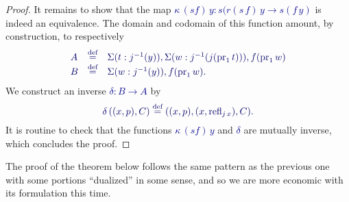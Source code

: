 \documentclass[10pt]{article}
\newcommand{\db}{\textcolor{darkblue}}
\newcommand{\m}[1]{\db{$#1$}}
\newcommand{\M}[1]{\[\db{#1}\]}
\newcommand{\fst}{\operatorname{pr}_1}
\newcommand{\refl}{\operatorname{refl}}
\newcommand{\eqdef}{\overset{\text{def}}{=}}
\theoremstyle{definition}
\begin{document}
\begin{proof}
  It remains to show that the map \m{\kappa \, (s f) \, y : s(r(s \,
    f) \, y \to s (f \, y)} is indeed an equivalence. The domain and
  codomain of this function amount, by construction, to respectively
  \M{
    \begin{array}{lll}
      A & \eqdef & \Sigma (t : j^{-1}(y)), \Sigma (w : j^{-1}(j (\fst t))), f (\fst w)\\
      B & \eqdef & \Sigma (w : j^{-1}(y)), f(\fst w).
    \end{array}
  }
  We construct an inverse \m{\delta : B \to A} by
  \M{
    \delta \, ((x , p),C) \eqdef ((x , p) , (x , \refl_{j \, x}) , C).
  }
  It is routine to check that the functions \m{\kappa \, (s f) \, y}
  and \m{\delta} are mutually inverse, which concludes the proof.
\end{proof}

The proof of the theorem below follows the same pattern as the
previous one with some portions ``dualized'' in some sense, and so we
are more economic with its formulation this time.
\end{document}

